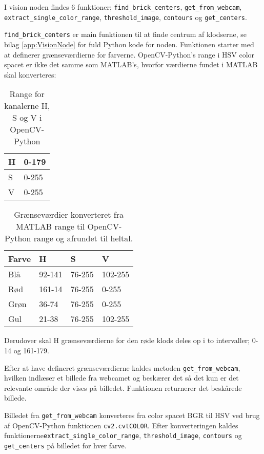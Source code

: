 I vision noden findes 6 funktioner; \texttt{find\_brick\_centers}, \texttt{get\_from\_webcam}, \texttt{extract\_single\_color\_range}, \texttt{threshold\_image}, \texttt{contours} og \texttt{get\_centers}.

\texttt{find\_brick\_centers} er main funktionen til at finde centrum af klodserne, se bilag \vref{app:VisionNode} for fuld Python kode for noden.
Funktionen starter med at definerer grænseværdierne for farverne.
OpenCV-Python's range i HSV color spacet er ikke det samme som MATLAB's, hvorfor værdierne fundet i MATLAB skal konverteres:
\begin{table}[H]
\centering
\begin{tabular}{l|l}
H		&	0-179\\
\hline
S		&	0-255\\
\hline
V		&	0-255\\
\end{tabular}	
\caption{Range for kanalerne H, S og V i OpenCV-Python}
\end{table}

\begin{table}[H]
\centering
\begin{tabular}{l|l|l|l}
Farve	&	H			&	S			&	V	\\
\hline
Blå		&	92-141		&	76-255	&	102-255	\\
Rød		&	161-14		&	76-255	&	0-255	\\
Grøn	&	36-74		&	76-255	&	0-255	\\
Gul		&	21-38		&	76-255	&	102-255	\\
\end{tabular}	
\caption{Grænseværdier konverteret fra MATLAB range til OpenCV-Python range og afrundet til heltal.}
\end{table}

Derudover skal H grænseværdierne for den røde klods deles op i to intervaller; 0-14 og 161-179.

Efter at have defineret grænseværdierne kaldes metoden \texttt{get\_from\_webcam}, hvilken indlæser et billede fra webcamet og beskærer det så det kun er det relevante område der vises på billedet.
Funktionen returnerer det beskårede billede.

Billedet fra \texttt{get\_from\_webcam} konverteres fra color spacet BGR til HSV ved brug af OpenCV-Python funktionen \texttt{cv2.cvtCOLOR}.
Efter konverteringen kaldes funktionerne\newline \texttt{extract\_single\_color\_range}, \texttt{threshold\_image}, \texttt{contours} og \texttt{get\_centers} på billedet for hver farve.

